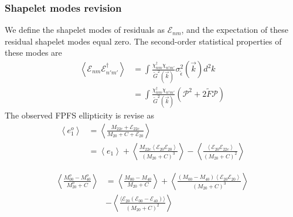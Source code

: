 \subsubsection{Shapelet modes revision}
We define the shapelet modes of residuals as $\mathcal{E}_{nm}$, and the
expectation of these residual shapelet modes equal zero. The second-order
statistical properties of these modes are
\begin{equation}
    \begin{split}
    \left\langle \mathcal{E}_{nm}\mathcal{E}^{\dagger}_{n'm'} \right\rangle
    &=\int \frac{\chi^\dagger_{nm}\chi_{n'm'}}{\tilde{G}^2(\vec{k})}
    \sigma^2_{\tilde{\epsilon}}(\vec{k})d^2k\\
    &=\int \frac{\chi^\dagger_{nm}\chi_{n'm'}}{\tilde{G}^2(\vec{k})}
    \left(\mathcal{P}^2+2\tilde{F}\mathcal{P}\right)
    \end{split}
\end{equation}
The observed FPFS ellipticity is revise as
\begin{equation}
    \begin{split}
    \left\langle e^o_1\right\rangle
    &=\left\langle\frac{M_{22c}+\mathcal{E}_{22c}}
        {M_{20}+C+\mathcal{E}_{20}}\right\rangle\\
    &=\left\langle e_1\right\rangle+
        \left\langle
        \frac{M_{22c}\left\langle\mathcal{E}_{20}\mathcal{E}_{20}\right\rangle}
        {(M_{20}+C)^3}
        \right\rangle
    -\left\langle
    \frac{\left\langle\mathcal{E}_{20}\mathcal{E}_{22c}\right\rangle}
        {(M_{20}+C)^2}
    \right\rangle
    \end{split}
\end{equation}

\begin{equation}
    \begin{split}
    \left\langle \frac{M^o_{00}-M^o_{40}}{M^o_{20}+C}\right\rangle
    &=\left\langle
        \frac{M_{00}-M_{40}}{M_{20}+C}\right\rangle+\left\langle
        \frac{\left(M_{00}-M_{40}\right)
            \left\langle\mathcal{E}_{20}\mathcal{E}_{20}\right\rangle}
        {(M_{20}+C)^3}
        \right\rangle\\
    &-\left\langle
    \frac{\langle\mathcal{E}_{20}
    (\mathcal{E}_{00}-\mathcal{E}_{40})\rangle}
    {(M_{20}+C)^2}
    \right\rangle
    \end{split}
\end{equation}

